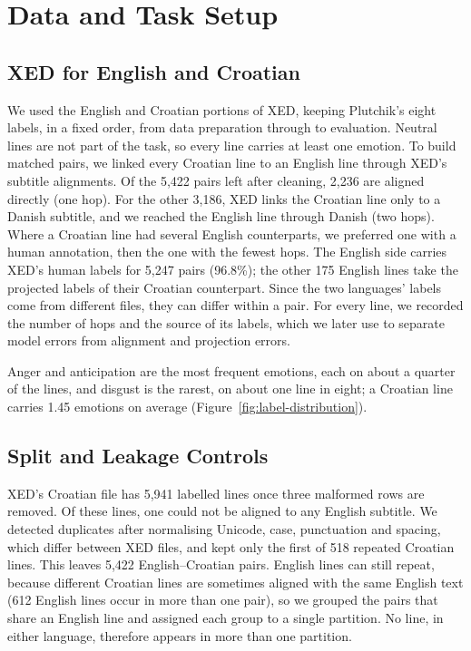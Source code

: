 \section{Data and Task Setup}
\label{sec:data}

\subsection{XED for English and Croatian}
\label{sec:data_xed}

We used the English and Croatian portions of XED, keeping Plutchik's eight labels, in a fixed order, from data preparation through to evaluation. Neutral lines are not part of the task, so every line carries at least one emotion. To build matched pairs, we linked every Croatian line to an English line through XED's subtitle alignments. Of the 5,422 pairs left after cleaning, 2,236 are aligned directly (one hop). For the other 3,186, XED links the Croatian line only to a Danish subtitle, and we reached the English line through Danish (two hops). Where a Croatian line had several English counterparts, we preferred one with a human annotation, then the one with the fewest hops. The English side carries XED's human labels for 5,247 pairs (96.8\%); the other 175 English lines take the projected labels of their Croatian counterpart. Since the two languages' labels come from different files, they can differ within a pair. For every line, we recorded the number of hops and the source of its labels, which we later use to separate model errors from alignment and projection errors.

Anger and anticipation are the most frequent emotions, each on about a quarter of the lines, and disgust is the rarest, on about one line in eight; a Croatian line carries 1.45 emotions on average (Figure~\ref{fig:label-distribution}).

\subsection{Split and Leakage Controls}
\label{sec:data_split}

XED's Croatian file has 5,941 labelled lines once three malformed rows are removed. Of these lines, one could not be aligned to any English subtitle. We detected duplicates after normalising Unicode, case, punctuation and spacing, which differ between XED files, and kept only the first of 518 repeated Croatian lines. This leaves 5,422 English--Croatian pairs. English lines can still repeat, because different Croatian lines are sometimes aligned with the same English text (612 English lines occur in more than one pair), so we grouped the pairs that share an English line and assigned each group to a single partition. No line, in either language, therefore appears in more than one partition.

